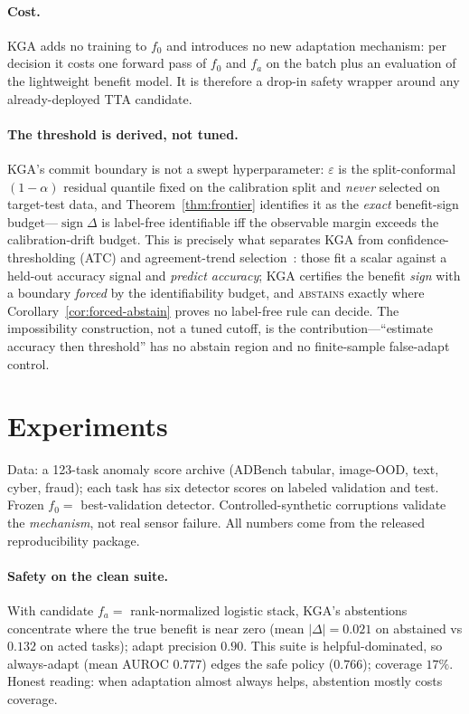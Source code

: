 \documentclass[conference]{IEEEtran}
\theoremstyle{plain}
\theoremstyle{definition}
\newcommand{\sign}{\operatorname{sign}}
\begin{document}
\paragraph{Cost.} \textsc{KGA} adds no training to $f_0$ and introduces no new adaptation
mechanism: per decision it costs one forward pass of $f_0$ and $f_a$ on the batch plus an
evaluation of the lightweight benefit model. It is therefore a drop-in safety wrapper around
any already-deployed TTA candidate.

\paragraph{The threshold is derived, not tuned.} \textsc{KGA}'s commit boundary is not a
swept hyperparameter: $\varepsilon$ is the split-conformal $(1-\alpha)$ residual quantile
fixed on the calibration split and \emph{never} selected on target-test data, and
Theorem~\ref{thm:frontier} identifies it as the \emph{exact} benefit-sign budget---$\sign\Delta$
is label-free identifiable iff the observable margin exceeds the calibration-drift budget. This
is precisely what separates \textsc{KGA} from confidence-thresholding (ATC) and agreement-trend
selection~\cite{kim2024taol}: those fit a scalar against a held-out accuracy signal and
\emph{predict accuracy}; \textsc{KGA} certifies the benefit \emph{sign} with a boundary
\emph{forced} by the identifiability budget, and \textsc{abstains} exactly where
Corollary~\ref{cor:forced-abstain} proves no label-free rule can decide. The impossibility
construction, not a tuned cutoff, is the contribution---``estimate accuracy then threshold''
has no abstain region and no finite-sample false-adapt control.

\section{Experiments}\label{sec:exp}
Data: a 123-task anomaly score archive (ADBench tabular, image-OOD, text, cyber,
fraud); each task has six detector scores on labeled validation and test. Frozen
$f_0=$ best-validation detector. Controlled-synthetic corruptions validate the
\emph{mechanism}, not real sensor failure. All numbers come from
the released reproducibility package.

\paragraph{Safety on the clean suite.} With candidate $f_a=$ rank-normalized logistic
stack, \textsc{KGA}'s abstentions concentrate where the true benefit is near zero
(mean $|\Delta|=0.021$ on abstained vs $0.132$ on acted tasks); adapt precision $0.90$.
This suite is helpful-dominated, so always-adapt (mean AUROC $0.777$) edges the safe
policy ($0.766$); coverage $17\%$. Honest reading: when adaptation almost always helps,
abstention mostly costs coverage.
\end{document}
